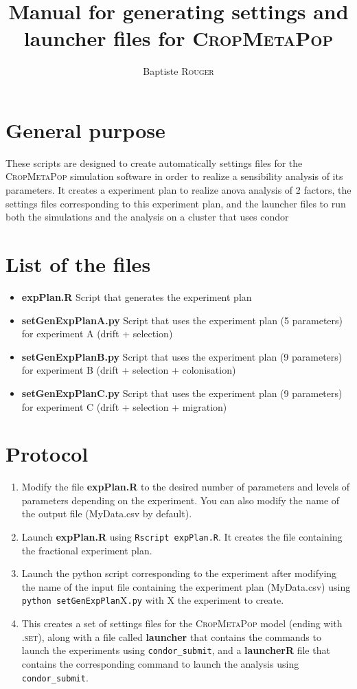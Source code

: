 \documentclass[10pt,a4paper]{article}
\title{Manual for generating settings and launcher files for \textsc{CropMetaPop}}
\author{Baptiste \textsc{Rouger}}
\begin{document}
\maketitle
\section{General purpose}
These scripts are designed to create automatically settings files for the \textsc{CropMetaPop} simulation software in order to realize a sensibility analysis of its parameters.
It creates a experiment plan to realize anova analysis of 2 factors, the settings files corresponding to this experiment plan, and the launcher files to run both the simulations and the analysis on a cluster that uses condor 


\section{List of the files}
\begin{itemize}
        \item \textbf{expPlan.R} Script that generates the experiment plan
        \item \textbf{setGenExpPlanA.py} Script that uses the experiment plan (5 parameters) for experiment A (drift + selection)
        \item \textbf{setGenExpPlanB.py} Script that uses the experiment plan (9 parameters) for experiment B (drift + selection + colonisation)
        \item \textbf{setGenExpPlanC.py} Script that uses the experiment plan (9 parameters) for experiment C (drift + selection + migration)
\end{itemize}

\section{Protocol}
\begin{enumerate}
        \item Modify the file \textbf{expPlan.R} to the desired number of parameters and levels of parameters depending on the experiment. You can also modify the name of the output file (MyData.csv by default).
    \item Launch \textbf{expPlan.R} using \texttt{Rscript expPlan.R}. It creates the file containing the fractional experiment plan.
    \item Launch the python script corresponding to the experiment after modifying the name of the input file containing the experiment plan (MyData.csv) using \texttt{python setGenExpPlan}X\texttt{.py} with X the experiment to create.
    \item This creates a set of settings files for the \textsc{CropMetaPop} model (ending with \textsc{.set}), along with a file called \textbf{launcher} that contains the commands to launch the experiments using \texttt{condor\_submit}, and a \textbf{launcherR} file that contains the corresponding command to launch the analysis using \texttt{condor\_submit}.
\end{enumerate}
\end{document}
